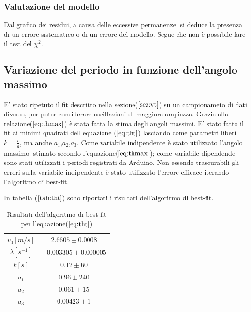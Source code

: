 \documentclass{article}
\begin{document}
\subsubsection{Valutazione del modello}

Dal grafico dei residui, a causa delle eccessive permanenze,  si deduce la presenza di un errore sistematico o di un errore del modello.
Segue che non è possibile fare il test del $\chi^2$. 

\subsection{Variazione del periodo in funzione dell'angolo massimo}

E' stato ripetuto il fit descritto nella sezione($\ref{sez:vt}$) su un campionameto di dati diverso, per poter considerare oscillazioni di maggiore ampiezza. Grazie alla relazione($\ref{eq:thmax}$) è stata fatta la stima degli angoli massimi.
E' stato fatto il fit ai minimi quadrati dell'equazione ($\ref{eq:tht}$) lasciando come parametri liberi $k=\frac{l}{g}$, ma anche $a_1$,$a_2$,$a_3$.
Come variabile indipendente è stato utilizzato l'angolo massimo, stimato secondo l'equazione($\ref{eq:thmax}$); come variabile dipendende sono stati utilizzati i periodi registrati da Arduino.
Non essendo trascurabili gli errori sulla variabile indipendente è stato utilizzato l'errore efficace iterando l'algoritmo di best-fit.

In tabella ($\ref{tab:tht}$) sono riportati i risultati dell'algoritmo di best-fit.

\begin{table}[h!]


	\centering
		\begin{tabular}{|cc|}
		\hline

			$v_0 [m/s]$ & $ 2.6605\pm0.0008$ \\
			$\lambda[s^{-1}]$ & $-0.003305\pm 0.000005$\\
			$k[s]$ & $0.12\pm60$\\
			$a_1$ &  $0.96\pm240$\\
			$a_2$ & $0.061\pm15$\\
			$a_3$ & $0.00423\pm1$\\

		\hline


		\end{tabular}
	\caption{Risultati dell'algoritmo di best fit per l'equazione($\ref{eq:tht}$)}
	\label{tab:tht}

\end{table}
\end{document}
